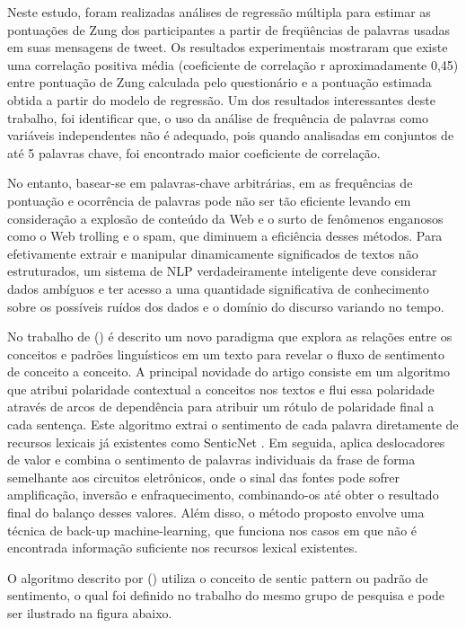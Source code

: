 \documentclass[
	12pt,				%
	openright,			%
	oneside,			%
	a4paper,			%
	english,			%
	spanish,			%
	brazil				%
	]{abntex2}
\begin{document}
	Neste estudo, foram realizadas análises de regressão múltipla para estimar as pontuações de Zung dos participantes a partir de freqüências de palavras usadas em suas mensagens de tweet. Os resultados experimentais mostraram que existe uma correlação positiva média (coeficiente de correlação r aproximadamente 0,45) entre pontuação de Zung calculada pelo questionário e a pontuação estimada obtida a partir do modelo de regressão. Um dos resultados interessantes deste trabalho, foi identificar que, o uso da análise de frequência de palavras como variáveis independentes não é adequado, pois quando analisadas em conjuntos de até 5 palavras chave, foi encontrado maior coeficiente de correlação.

	No entanto, basear-se em palavras-chave arbitrárias, em as frequências de pontuação e ocorrência de palavras pode não ser tão eficiente levando em consideração a explosão de conteúdo da Web e o surto de fenômenos enganosos como o Web trolling e o spam, que diminuem a eficiência desses métodos. Para efetivamente extrair e manipular dinamicamente significados de textos não estruturados, um sistema de NLP verdadeiramente inteligente deve considerar dados ambíguos e ter acesso a uma quantidade significativa de conhecimento sobre os possíveis ruídos dos dados e o domínio do discurso variando no tempo.

	No trabalho de \citeauthor{article_sentiment_analysis} (\citeyear{article_sentiment_analysis}) é descrito um novo paradigma que explora as relações entre os conceitos e padrões linguísticos em um texto para revelar o fluxo de sentimento de conceito a conceito. A principal novidade do artigo consiste em um algoritmo que atribui polaridade contextual a conceitos nos textos e flui essa polaridade através de arcos de dependência para atribuir um rótulo de polaridade final a cada sentença. Este algoritmo extrai o sentimento de cada palavra diretamente de recursos lexicais já existentes como SenticNet  \cite{Cambria2014}. Em seguida, aplica deslocadores de valor e combina o sentimento de palavras individuais da frase de forma semelhante aos circuitos eletrônicos, onde o sinal das fontes pode sofrer amplificação, inversão e enfraquecimento, combinando-os até obter o resultado final do balanço desses valores. Além disso, o método proposto envolve uma técnica de back-up machine-learning, que funciona nos casos em que não é encontrada informação suficiente nos recursos lexical existentes.

 	O algoritmo descrito por \citeauthor{article_sentiment_analysis} (\citeyear{article_sentiment_analysis}) utiliza o conceito de sentic pattern ou padrão de sentimento, o qual foi definido no trabalho do mesmo grupo de pesquisa \cite{article_Poria2014} e pode ser ilustrado na figura abaixo.
\end{document}
